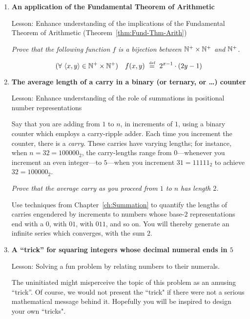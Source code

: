 \begin{enumerate}
\item
{\bf An application of the Fundamental Theorem of Arithmetic}

{\sc Lesson:} Enhance understanding of the implications of the Fundamental Theorem of Arithmetic (Theorem~\ref{thm:Fund-Thm-Arith})

\smallskip

{\em Prove that the following function $f$ is a bijection between $\mathbb{N}^+ \times \mathbb{N}^+$ and $\mathbb{N}^+$.}

\[ (\forall \ \langle x,y \rangle \in \mathbb{N}^+ \times \mathbb{N}^+) 
\ \ \ f(x,y) \ \stackrel{\mbox{{\tiny def}}}{=} \ 2^{x-1} \cdot (2y -1) \]

\item
{\bf The average length of a carry in a binary (or ternary, or \ldots) counter}

{\sc Lesson:} Enhance understanding of the role of summations in positional number representations

\smallskip

Say that you are adding from $1$ to $n$, in increments of $1$, using a binary counter which employs a carry-ripple adder.  Each time you increment the counter, there is a {\it carry}.  These carries have varying lengths; for instance, when $n = 32 = 100000_2$, the carry-lengths range
from $0$---whenever you increment an even integer---to $5$---when you increment $31 = 11111_2$ to achieve $32 = 100000_2$.

\smallskip

{\em Prove that the average carry as you proceed from $1$ to $n$ has length $2$.}

\medskip

Use techniques from Chapter~\ref{ch:Summation} to quantify the lengths of carries engendered by increments to numbers whose base-$2$ representations end with a $0$,  with $01$, with $011$, and so on.  You will thereby generate an infinite series which converges, with the sum $2$. 


\item
{\bf A ``trick'' for squaring integers whose decimal numeral ends in $5$}

{\sc Lesson:} Solving a fun problem by relating numbers to their numerals.

\smallskip

The uninitiated might misperceive the topic of this problem as an amusing ``trick''.  Of course, we would not present the ``trick" if there were not a serious mathematical message behind it.  Hopefully you will be inspired to design your own ``tricks". 


\end{enumerate}
